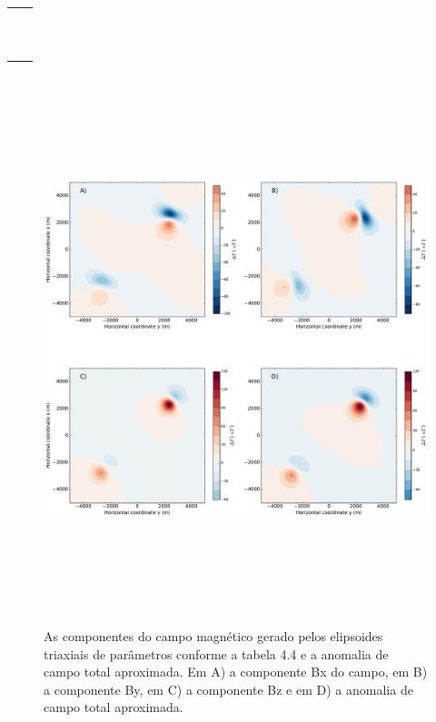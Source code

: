 \begin{table}[h!]
	\begin{center}
		\begin{tabular}{lc}
			
			&  \\
			& \\
			& \\
			& \\
			& \\
			& \\ 
			& \\
			& \\
				& \\
				& \\ 
				& \\
		\end{tabular}
	\end{center}
\end{table}

\begin{figure}[hbt!]
	\centering \includegraphics[width=16cm,height=16cm]{figures/ellipsoid_triaxial_multi}
	\caption[As componentes do campo magnético gerado por dois corpos triaxiais e a anomalia de campo total aproximada.]{As componentes 
		do campo magnético gerado pelos elipsoides triaxiais de parâmetros conforme a tabela 4.4 e a anomalia de campo total aproximada. Em A) a componente Bx do campo, em B) a componente By, em C) a componente Bz e em D) a anomalia de campo total aproximada.}
	\label{fig:ellipsoid_triaxial_multi}
\end{figure}

